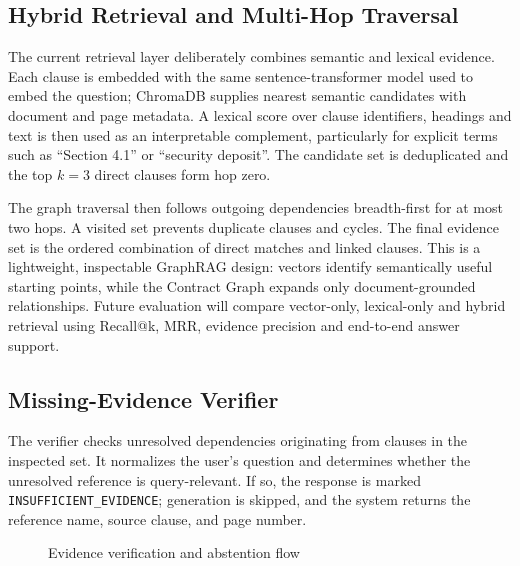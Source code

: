 \documentclass[12pt,a4paper,oneside]{report}
\begin{document}
\subsection{Hybrid Retrieval and Multi-Hop Traversal}
The current retrieval layer deliberately combines semantic and lexical evidence. Each clause is embedded with the same sentence-transformer model used to embed the question; ChromaDB supplies nearest semantic candidates with document and page metadata. A lexical score over clause identifiers, headings and text is then used as an interpretable complement, particularly for explicit terms such as ``Section 4.1'' or ``security deposit''. The candidate set is deduplicated and the top \(k=3\) direct clauses form hop zero.

The graph traversal then follows outgoing dependencies breadth-first for at most two hops. A visited set prevents duplicate clauses and cycles. The final evidence set is the ordered combination of direct matches and linked clauses. This is a lightweight, inspectable GraphRAG design: vectors identify semantically useful starting points, while the Contract Graph expands only document-grounded relationships. Future evaluation will compare vector-only, lexical-only and hybrid retrieval using Recall@k, MRR, evidence precision and end-to-end answer support.

\subsection{Missing-Evidence Verifier}
The verifier checks unresolved dependencies originating from clauses in the inspected set. It normalizes the user's question and determines whether the unresolved reference is query-relevant. If so, the response is marked \texttt{INSUFFICIENT\_EVIDENCE}; generation is skipped, and the system returns the reference name, source clause, and page number.

\begin{figure}[H]
\centering
{}
\caption{Evidence verification and abstention flow}
\label{fig:verification}
\end{figure}
\end{document}
